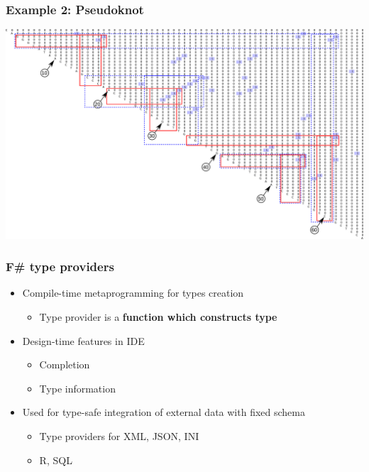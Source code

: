 \documentclass[xcolor=table]{beamer}
\begin{document}
\begin{frame}[fragile]
  \transwipe[direction=90]
  \frametitle{Example 2: Pseudoknot}
\centering
\includegraphics[width=\textwidth]{pictures/0m.pdf}
\end{frame}

\begin{frame}
  \transwipe[direction=90]
  \frametitle{F\# type providers}
\begin{itemize}
 \item Compile-time metaprogramming for types creation
 \begin{itemize}
  \item Type provider is a \textbf{function which constructs type}
 \end{itemize}
 \item Design-time features in IDE
 \begin{itemize}
   \item Completion
   \item Type information
 \end{itemize}
 \item Used for type-safe integration of external data with fixed schema
 \begin{itemize}
   \item Type providers for XML, JSON, INI
   \item R, SQL
 \end{itemize}
\end{itemize}

\end{frame}
\end{document}
